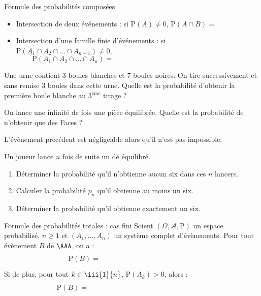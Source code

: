 \documentclass[french,11pt,twoside]{VcCours}
\renewcommand{\P}{\text{P}}
\begin{document}
\begin{Theoreme}{Formule des probabilités composées}
 \begin{itemize}
  \item Intersection de deux événements : si $\P(A) \ne 0$, $\P(A\cap B) = $
  \item Intersection d'une famille finie d'événements : si $\P(A_1 \cap A_2 \cap \ldots \cap A_{n-1}) \neq 0$,
   $$\P(A_1 \cap A_2 \cap \ldots \cap A_n)= \qquad \qquad \qquad \phantom{ahahaaaaaaaaaaaa bla bla bla}$$
 \end{itemize}
\end{Theoreme}

\begin{Exemple} Une urne contient 3 boules blanches et 7 boules noires. On tire successivement et sans remise 3 boules dans cette urne. Quelle est la probabilité d'obtenir la première boule blanche au 3$^{\text{ème}}$ tirage ?

\vspace{4cm}
\end{Exemple}


\begin{Exemple} On lance une infinité de fois une pièce équilibrée. Quelle est la probabilité de n'obtenir que des Faces ?

\vspace{5cm}
\end{Exemple}


\begin{Remarque}{} L'évènement précédent est négligeable alors qu'il n'est pas impossible.
\end{Remarque}

\begin{ApplicationDirecte}{} Un joueur lance $n$ fois de suite un dé équilibré.
 \begin{enumerate}
  \item Déterminer la probabilité qu'il n'obtienne aucun six dans ces $n$ lancers.
  \item Calculer la probabilité $p_n$ qu'il obtienne au moins un six.
  \item Déterminer la probabilité qu'il obtienne exactement un six.
 \end{enumerate}
 \end{ApplicationDirecte}
 
\begin{Theoreme}{Formule des probabilités totales : cas fini}
Soient $(\Omega, \mathcal{A}, \P)$ un espace probabilisé, $n \geq 1$ et $(A_1, \ldots, A_n)$ un système complet d'évènements. Pour tout évènement $B$ de $\AAA$, on a :
$$ \P(B) = \phantom{blabbbbbbbbbbb\sum_{k=1}^n P(A_k \cap B)}$$
Si de plus, pour tout $k \in \iii{1}{n}$, $\P(A_k) >0$, alors :
$$\P(B) = \phantom{blabbbbbbbbbbb \sum_{k=1}^n P(A_k) \times P_{A_k}(B)} $$
\end{Theoreme}
\end{document}
